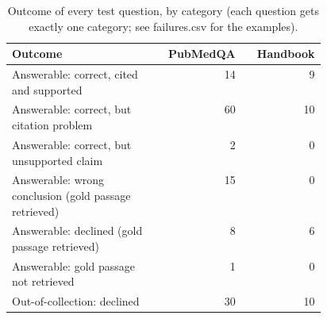 \begin{table}[t]
\centering\small
\begin{tabular}{p{0.46\linewidth}rr}
\toprule
Outcome & PubMedQA & Handbook \\
\midrule
Answerable: correct, cited and supported & 14 & 9 \\
Answerable: correct, but citation problem & 60 & 10 \\
Answerable: correct, but unsupported claim & 2 & 0 \\
Answerable: wrong conclusion (gold passage retrieved) & 15 & 0 \\
Answerable: declined (gold passage retrieved) & 8 & 6 \\
Answerable: gold passage not retrieved & 1 & 0 \\
Out-of-collection: declined & 30 & 10 \\
\bottomrule
\end{tabular}
\caption{Outcome of every test question, by category (each question gets exactly one category; see failures.csv for the examples).}
\label{tab:failures}
\end{table}
